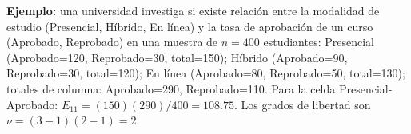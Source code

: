 \begin{solproblema}[prob:a5524c8]
	\textbf{Ejemplo:} una universidad investiga si existe relación entre la modalidad de estudio (Presencial, Híbrido, En línea) y la tasa de aprobación de un curso (Aprobado, Reprobado) en una muestra de $n=400$ estudiantes: Presencial (Aprobado=120, Reprobado=30, total=150); Híbrido (Aprobado=90, Reprobado=30, total=120); En línea (Aprobado=80, Reprobado=50, total=130); totales de columna: Aprobado=290, Reprobado=110. Para la celda Presencial-Aprobado: $E_{11} = (150)(290)/400 = 108.75$. Los grados de libertad son $\nu=(3-1)(2-1)=2$.
\end{solproblema}
